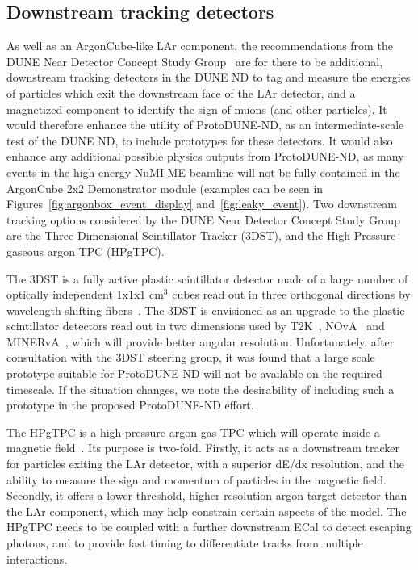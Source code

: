 
\subsection{Downstream tracking detectors}
\label{sec:tracking_detectors}
As well as an ArgonCube-like LAr component, the recommendations from the DUNE Near Detector Concept Study Group~\cite{dune_ndcsg} are for there to be additional, downstream tracking detectors in the DUNE ND to tag and measure the energies of particles which exit the downstream face of the LAr detector, and a magnetized component to identify the sign of muons (and other particles). It would therefore enhance the utility of ProtoDUNE-ND, as an intermediate-scale test of the DUNE ND, to include prototypes for these detectors. It would also enhance any additional possible physics outputs from ProtoDUNE-ND, as many events in the high-energy NuMI ME beamline will not be fully contained in the ArgonCube 2x2 Demonstrator module (examples can be seen in Figures~\ref{fig:argonbox_event_display} and~\ref{fig:leaky_event}). Two downstream tracking options considered  by the DUNE Near Detector Concept Study Group are the Three Dimensional Scintillator Tracker (3DST), and the High-Pressure gaseous argon TPC (HPgTPC).

The 3DST is a fully active plastic scintillator detector made of a large number of optically independent 1x1x1 cm$^{3}$ cubes read out in three orthogonal directions by wavelength shifting fibers~\cite{3dst}. The 3DST is envisioned as an upgrade to the plastic scintillator detectors read out in two dimensions used by T2K~\cite{t2k-fgd,t2k-ingrid}, NOvA~\cite{nova} and MINERvA~\cite{minerva-nim}, which will provide better angular resolution. Unfortunately, after consultation with the 3DST steering group, it was found that a large scale prototype suitable for ProtoDUNE-ND will not be available on the required timescale. If the situation changes, we note the desirability of including such a prototype in the proposed ProtoDUNE-ND effort.

The HPgTPC is a high-pressure argon gas TPC which will operate inside a magnetic field~\cite{dune_ndcsg}. Its purpose is two-fold. Firstly, it acts as a downstream tracker for particles exiting the LAr detector, with a superior dE/dx resolution, and the ability to measure the sign and momentum of particles in the magnetic field. Secondly, it offers a lower threshold, higher resolution argon target detector than the LAr component, which may help constrain certain aspects of the model. The HPgTPC needs to be coupled with a further downstream ECal to detect escaping photons, and to provide fast timing to differentiate tracks from multiple interactions. 




